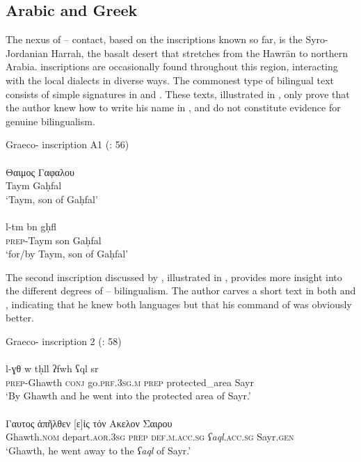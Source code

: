 \documentclass[output=paper]{langsci/langscibook}
\begin{document}
\subsection{Arabic and Greek}
The nexus of -- contact, based on the inscriptions known so far, is the Syro-Jordanian Harrah, the basalt desert that stretches from the Hawrān to northern Arabia.  inscriptions are occasionally found throughout this region, interacting with the local  dialects in diverse ways. The commonest type of bilingual text consists of simple signatures in  and . These texts, illustrated in , only prove that the author knew how to write his name in , and do not constitute evidence for genuine {bilingualism}. 

\ea Graeco- inscription A1 (\citealt{Al-Jalladal-Manaser2016}: 56)\label{Taym}\\
 \\ 
\gll    Θαιμος Γαφαλου \\
        Taym Gaḥfal\\
\glt `Taym, son of Gaḥfal'\\

 \\
\gll   l-tm bn gḥfl \\
       \textsc{prep}-Taym son Gaḥfal \\
\glt `for/by Taym, son of Gaḥfal'\\
\z
\z

 The second inscription discussed by \citet{Al-Jalladal-Manaser2016}, illustrated in , provides more insight into the different degrees of -- {bilingualism}. The author carves a short text in both  and  , indicating that he knew both languages but that his command of  was obviously better.

\ea Graeco- inscription 2 (\citealt{Al-Jalladal-Manaser2016}: 58)\label{Ghawth}\\
 \\
\gll   l-ɣθ w tḥll ʔfwh ʕql sr \\
       \textsc{prep}-Ghawth \textsc{conj} go.\textsc{prf.3sg.m} \textsc{prep} protected\_area Sayr\\
\glt `By Ghawth and he went into the protected area of Sayr.'\\
 \\ 
\gll    Γαυτος ἀπῆλθεν [ε]ἰς τόν Ακελον Σαιρου\\
Ghawth.\textsc{nom} depart.\textsc{aor.3sg} \textsc{prep} \textsc{def.m.acc.sg} \textit{ʕaql}.\textsc{acc.sg} Sayr.\textsc{gen}\\ 
\glt `Ghawth, he went away to the \textit{ʕaql} of Sayr.'\\
\z
\z
\end{document}
